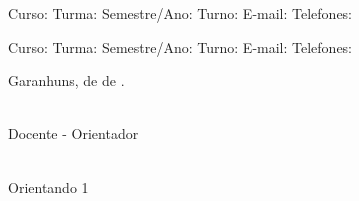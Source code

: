 \documentclass[12pt, a4paper]{article}
\begin{document}
\vspace{0.5cm}

 \underline{\hspace{14.5cm}}
Curso: \underline{\hspace{14.5cm}}
Turma: \underline{\hspace{3cm}} Semestre/Ano: \underline{\hspace{3cm}} Turno:
\underline{\hspace{3.5cm}}
E-mail: \underline{\hspace{14.5cm}}
Telefones: \underline{\hspace{14cm}}

\vspace{0.5cm}

 \underline{\hspace{14.5cm}}
Curso: \underline{\hspace{14.5cm}}
Turma: \underline{\hspace{3cm}} Semestre/Ano: \underline{\hspace{3cm}} Turno:
\underline{\hspace{3.5cm}}
E-mail: \underline{\hspace{14.5cm}}
Telefones: \underline{\hspace{14cm}}

\vspace{1cm}

\begin{center}
  Garanhuns, \underline{\hspace{1cm}} de \underline{\hspace{3cm}} de
  \underline{\hspace{1.5cm}}.
\end{center}

\vspace{1cm}

\begin{center}
  \underline{\hspace{7cm}} \\
  Docente - Orientador
\end{center}

\vspace{0.5cm}

\begin{center}
  \underline{\hspace{7cm}} \\
  Orientando 1
\end{center}
\end{document}
